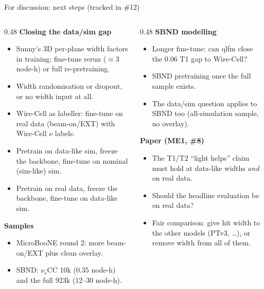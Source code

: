 \documentclass[aspectratio=169,10pt]{beamer}
\newcommand{\iss}[1]{{\color{blue!60!black}\##1}}
\begin{document}
\begin{frame}{For discussion: next steps (tracked in \iss{12})}
  \footnotesize
  \begin{columns}[T]
    \begin{column}{0.48\textwidth}
      \textbf{Closing the data/sim gap}
      \begin{itemize}
        \item Sunny's 3D per-plane width factors in training: fine-tune rerun ($\approx$3 node-h) or full re-pretraining.
        \item Width randomisation or dropout, or no width input at all.
        \item Wire-Cell as labeller: fine-tune on real data (beam-on/EXT) with Wire-Cell $\nu$ labels.
        \item Pretrain on data-like sim, freeze the backbone, fine-tune on nominal (sim-like) sim.
        \item Pretrain on real data, freeze the backbone, fine-tune on data-like sim.
      \end{itemize}
      \textbf{Samples}
      \begin{itemize}
        \item MicroBooNE round 2: more beam-on/EXT plus clean overlay.
        \item SBND: $\nu_e$CC 10k (0.35 node-h) and the full 923k (12--30 node-h).
      \end{itemize}
    \end{column}
    \begin{column}{0.48\textwidth}
      \textbf{SBND modelling}
      \begin{itemize}
        \item Longer fine-tune: can qlfm close the 0.06 T1 gap to Wire-Cell?
        \item SBND pretraining once the full sample exists.
        \item The data/sim question applies to SBND too (all-simulation sample, no overlay).
      \end{itemize}
      \textbf{Paper (ME1, \iss{8})}
      \begin{itemize}
        \item The T1/T2 ``light helps'' claim must hold at data-like widths \emph{and} on real data.
        \item Should the headline evaluation be on real data?
        \item Fair comparison: give hit width to the other models (PTv3, \dots), or remove width from all of them.
      \end{itemize}
    \end{column}
  \end{columns}
\end{frame}
\end{document}
